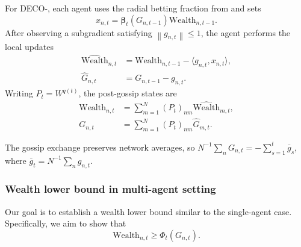 \documentclass[journal]{IEEEtran}
\newcommand{\w}{\text{Wealth}}
\newcommand{\norm}[1]{\left\lVert{#1}\right\rVert}
\newcommand{\algname}{{DECO}\xspace}
\begin{document}
    {\color{blue}
        For \algname{}-, each agent uses the radial betting fraction from  and sets
        \begin{equation}\label{eq:x_nt}
            x_{n,t} = \boldsymbol{\beta}_t(G_{n,t-1})\w_{n,t-1}.
        \end{equation}
        After observing a subgradient satisfying $\norm{g_{n,t}}\leq1$, the agent performs the local updates
        \begin{align}
            \widehat{\w}_{n,t} & = \w_{n,t-1}-\langle g_{n,t},x_{n,t}\rangle,\label{eq:w_nt} \\
            \widehat G_{n,t}   & = G_{n,t-1}-g_{n,t}.\label{eq:C_nt}
        \end{align}
        Writing $P_t=W^{q(t)}$, the post-gossip states are
        \begin{align}
            \w_{n,t} & = \sum_{m=1}^N {(P_t)}_{nm}\widehat{\w}_{m,t},\label{eq:gossiped_w} \\
            G_{n,t}  & = \sum_{m=1}^N {(P_t)}_{nm}\widehat G_{m,t}.\label{eq:gossiped_c}
        \end{align}

        The gossip exchange preserves network averages, so $N^{-1}\sum_n G_{n,t}=-\sum_{s=1}^t \bar g_s$, where $\bar g_t=N^{-1}\sum_n g_{n,t}$.
        \par}

\subsubsection*{Wealth lower bound in multi-agent setting}

Our goal is to establish a wealth lower bound similar to the single-agent case.
Specifically, we aim to show that
{\color{blue}
\begin{equation}\label{eq:wealth_lb}
    \w_{n,t} \geq \Phi_t(G_{n,t}).
\end{equation}
}
\end{document}
